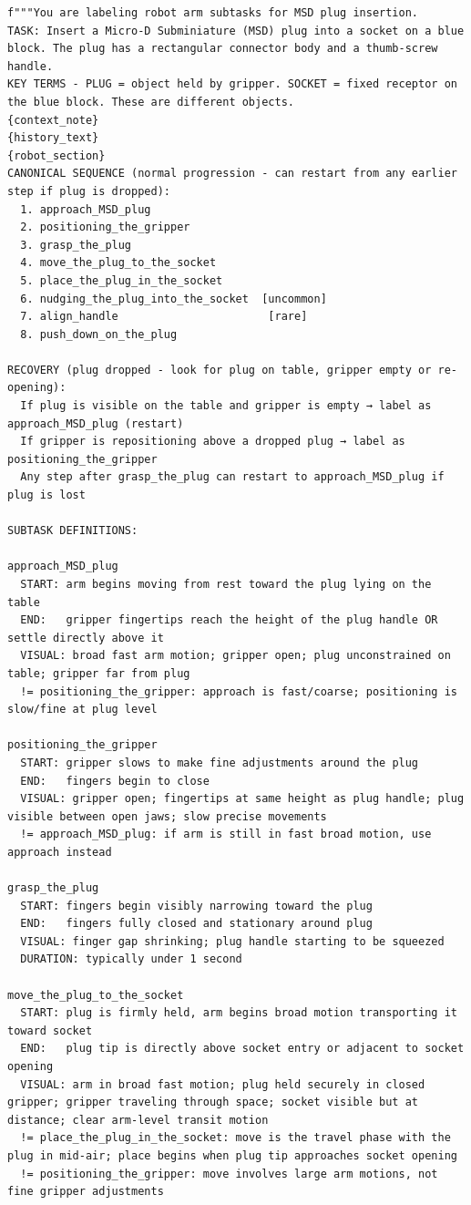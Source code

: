 \documentclass[conference]{IEEEtran}
\begin{document}
\begin{lstlisting}[caption={MSD Plug Insertion Labeling Prompt used for Qwen3}, label={lst:Qwen_msd_prompt}]
 f"""You are labeling robot arm subtasks for MSD plug insertion.
TASK: Insert a Micro-D Subminiature (MSD) plug into a socket on a blue block. The plug has a rectangular connector body and a thumb-screw handle.
KEY TERMS - PLUG = object held by gripper. SOCKET = fixed receptor on the blue block. These are different objects.
{context_note}
{history_text}
{robot_section}
CANONICAL SEQUENCE (normal progression - can restart from any earlier step if plug is dropped):
  1. approach_MSD_plug
  2. positioning_the_gripper
  3. grasp_the_plug
  4. move_the_plug_to_the_socket
  5. place_the_plug_in_the_socket
  6. nudging_the_plug_into_the_socket  [uncommon]
  7. align_handle                       [rare]
  8. push_down_on_the_plug

RECOVERY (plug dropped - look for plug on table, gripper empty or re-opening):
  If plug is visible on the table and gripper is empty → label as approach_MSD_plug (restart)
  If gripper is repositioning above a dropped plug → label as positioning_the_gripper
  Any step after grasp_the_plug can restart to approach_MSD_plug if plug is lost

SUBTASK DEFINITIONS:

approach_MSD_plug
  START: arm begins moving from rest toward the plug lying on the table
  END:   gripper fingertips reach the height of the plug handle OR settle directly above it
  VISUAL: broad fast arm motion; gripper open; plug unconstrained on table; gripper far from plug
  != positioning_the_gripper: approach is fast/coarse; positioning is slow/fine at plug level

positioning_the_gripper
  START: gripper slows to make fine adjustments around the plug
  END:   fingers begin to close
  VISUAL: gripper open; fingertips at same height as plug handle; plug visible between open jaws; slow precise movements
  != approach_MSD_plug: if arm is still in fast broad motion, use approach instead

grasp_the_plug
  START: fingers begin visibly narrowing toward the plug
  END:   fingers fully closed and stationary around plug
  VISUAL: finger gap shrinking; plug handle starting to be squeezed
  DURATION: typically under 1 second

move_the_plug_to_the_socket
  START: plug is firmly held, arm begins broad motion transporting it toward socket
  END:   plug tip is directly above socket entry or adjacent to socket opening
  VISUAL: arm in broad fast motion; plug held securely in closed gripper; gripper traveling through space; socket visible but at distance; clear arm-level transit motion
  != place_the_plug_in_the_socket: move is the travel phase with the plug in mid-air; place begins when plug tip approaches socket opening
  != positioning_the_gripper: move involves large arm motions, not fine gripper adjustments


\end{lstlisting}
\end{document}
